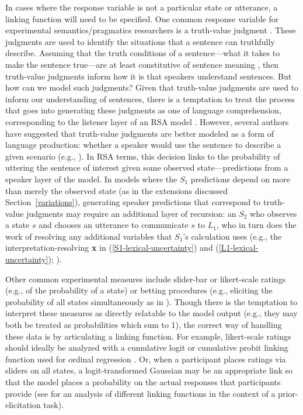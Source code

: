 \documentclass[10pt,letterpaper]{article}
\begin{document}
In cases where the response variable is not a particular state or utterance, a linking function will need to be specified. One common response variable for experimental semantics/pragmatics researchers is a truth-value judgment \cite{crainmckee1985,crainthornton1998}. These judgments are used to identify the situations that a sentence can truthfully describe. Assuming that the truth conditions of a sentence---what it takes to make the sentence true---are at least constitutive of sentence meaning \cite{chierchiamcconnellginet2000}, then truth-value judgments inform how it is that speakers understand sentences. But how can we model such judgments? Given that truth-value judgments are used to inform our understanding of sentences, there is a temptation to treat the process that goes into generating these judgments as one of language comprehension, corresponding to the listener layer of an RSA model \cite{PottsLassiter2016:Embedded-implic}. However, several authors have suggested that truth-value judgments are better modeled as a form of language production: whether a speaker would use the sentence to describe a given scenario (e.g., \cite{degengoodman2014,Franke2016:Task-types-link,savinellietal2017,tesslergoodman2019,jasbietal2019}). In RSA terms, this decision links to the probability of uttering the sentence of interest given some observed state---predictions from a speaker layer of the model. In models where the $S_1$ predictions depend on more than merely the observed state (as in the extensions discussed Section~\ref{variations}), generating speaker predictions that correspond to truth-value judgments may require an additional layer of recursion: an $S_2$ who observes a state $s$ and chooses an utterance to communicate $s$ to $L_1$, who in turn does the work of resolving any additional variables that $S_1$'s calculation uses (e.g., the interpretation-resolving \textbf{x} in (\ref{S1-lexical-uncertainty}) and (\ref{L1-lexical-uncertainty}); \cite{savinellietal2017}).

Other common experimental measures include slider-bar or likert-scale ratings (e.g., of the probability of a state) or betting procedures (e.g., eliciting the probability of all states simultaneously as in \cite{frankgoodman2012}). 
Though there is the temptation to interpret these measures as directly relatable to the model output (e.g., they may both be treated as probabilities which sum to 1), the correct way of handling these data is by articulating a linking function.
For example, likert-scale ratings should ideally be analyzed with a cumulative logit or cumulative probit linking function used for ordinal regression \cite{Franke2014:Typical-use-of-,Franke2016:Task-types-link}.
Or, when a participant places ratings via sliders on all states, a logit-transformed Gaussian may be an appropriate link so that the model places a probability on the actual responses that participants provide (see \cite{franke2016does} for an analysis of different linking functions in the context of a prior-elicitation task).
\end{document}
